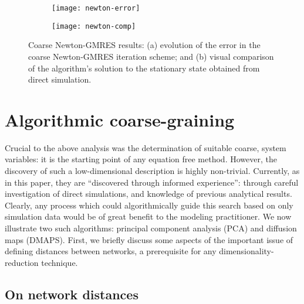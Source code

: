   \begin{figure}
    \vspace{-5mm} \centering
    \begin{subfigure}{0.49\textwidth}
      \centering
      \texttt{[image: newton-error]}
      \subcaption{\label{fig:newton-error}}
    \end{subfigure} %
    \begin{subfigure}{0.49\textwidth}
      \centering
      \texttt{[image: newton-comp]}
      \subcaption{\label{fig:newton-comp}}
    \end{subfigure}%
    \caption[Coarse Newton-GMRES results]{Coarse Newton-GMRES results:
      (a) evolution of the error in the coarse Newton-GMRES iteration
      scheme; and (b) visual comparison of the algorithm's solution to
      the stationary state obtained from direct
      simulation. \label{fig:newton-results}}
  \end{figure}


  \section{Algorithmic coarse-graining}
  \label{sec:dr}
  Crucial to the above analysis was the determination of suitable
  coarse, system variables: it is the starting point of any equation
  free method.
  However, the discovery of such a low-dimensional description is
  highly non-trivial.
  Currently, as in this paper, they are ``discovered through informed
  experience'': through careful investigation of direct simulations,
  and knowledge of previous analytical results.
  Clearly, any process which could algorithmically guide this search
  based on only simulation data would be of great benefit to the
  modeling practitioner.
  We now illustrate two such algorithms: principal component analysis
  (PCA) and diffusion maps (DMAPS).
  First, we briefly discuss some aspects of the important issue of
  defining distances between networks, a prerequisite for any
  dimensionality-reduction technique.

  \subsection{On network distances}

